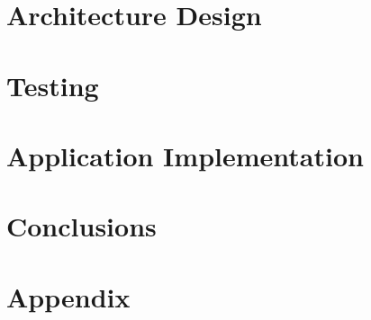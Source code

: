 \documentclass{report}
\begin{document}
\chapter{Architecture Design}


\chapter{Testing}


\chapter{Application Implementation}


\chapter{Conclusions}



{}


\chapter{Appendix}

\end{document}
